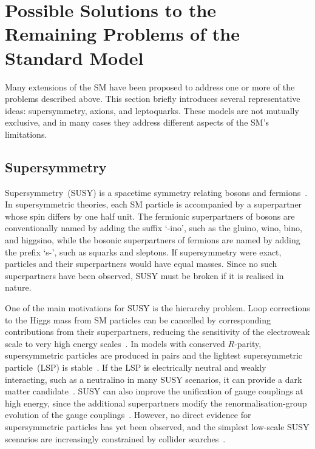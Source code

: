 \section{Possible Solutions to the Remaining Problems of the Standard Model}
\label{sec:bsm_solutions}

Many extensions of the SM have been proposed to address one or more of the problems described above. 
This section briefly introduces several representative ideas: supersymmetry, axions, and leptoquarks. 
These models are not mutually exclusive, and in many cases they address different aspects of the SM's limitations.

\subsection{Supersymmetry}
\label{subsec:susy}

Supersymmetry~(SUSY) is a spacetime symmetry relating bosons and fermions~\cite{WessZumino1974,MartinSUSYPrimer}.
In supersymmetric theories, each SM particle is accompanied by a superpartner whose spin differs by one half unit.
The fermionic superpartners of bosons are conventionally named by adding the suffix `-ino', such as the gluino, wino, bino, and higgsino, while the bosonic superpartners of fermions are named by adding the prefix `s-', such as squarks and sleptons.
If supersymmetry were exact, particles and their superpartners would have equal masses.
Since no such superpartners have been observed, SUSY must be broken if it is realised in nature.

One of the main motivations for SUSY is the hierarchy problem.
Loop corrections to the Higgs mass from SM particles can be cancelled by corresponding contributions from their superpartners, reducing the sensitivity of the electroweak scale to very high energy scales~\cite{DimopoulosGeorgi1981,MartinSUSYPrimer}.
In models with conserved $R$-parity, supersymmetric particles are produced in pairs and the lightest supersymmetric particle~(LSP) is stable~\cite{FarrarFayet1978,MartinSUSYPrimer}.
If the LSP is electrically neutral and weakly interacting, such as a neutralino in many SUSY scenarios, it can provide a dark matter candidate~\cite{Goldberg1983,EllisOliveSantosoSpanos1984}.
SUSY can also improve the unification of gauge couplings at high energy, since the additional superpartners modify the renormalisation-group evolution of the gauge couplings~\cite{DimopoulosRabyWilczek1981,Amaldi1991}.
However, no direct evidence for supersymmetric particles has yet been observed, and the simplest low-scale SUSY scenarios are increasingly constrained by collider searches~\cite{ATLAS2024SUSYSummary}.

